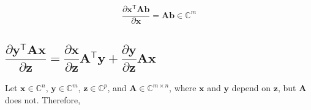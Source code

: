 \documentclass{article}
\newcommand{\trans}{\mathsf{T}}
\begin{document}
\begin{align}
    \boxed{\dfrac{\partial \mathbf{x}^\trans \mathbf{A} \mathbf{b}}{\partial \mathbf{x}} = \mathbf{Ab} \in \mathbb{C}^{m}}
\end{align}


\subsection{\(\dfrac{\partial \mathbf{y}^\trans \mathbf{A} \mathbf{x}}{\partial \mathbf{z}} = \dfrac{\partial \mathbf{x}}{\partial \mathbf{z}} \mathbf{A}^{\trans} \mathbf{y} + \dfrac{\partial \mathbf{y}}{\partial \mathbf{z}} \mathbf{A} \mathbf{x}\)}
Let \(\mathbf{x} \in \mathbb{C}^{n}\), \(\mathbf{y} \in \mathbb{C}^{m}\), \(\mathbf{z} \in \mathbb{C}^{p}\), and \(\mathbf{A}\in \mathbb{C}^{m\times n}\), where \(\mathbf{x}\) and \(\mathbf{y}\) depend on \(\mathbf{z}\), but \(\mathbf{A}\) does not. Therefore,
\end{document}
